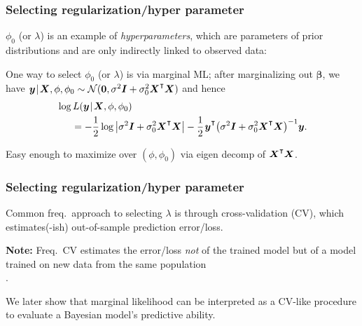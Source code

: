 \documentclass[18pt]{beamer}
\newcommand{\defineTightSpacing}{%
	\setlength{\abovedisplayskip}{.25\baselineskip}%
	\setlength{\belowdisplayskip}{.25\baselineskip}%
}
\renewcommand{\textsc}[1]{{\small \MakeUppercase{#1}}}
\newcommand{\given}{\thinnerspace | \thinnerspace}
\newcommand{\transpose}{\text{\raisebox{.5ex}{$\intercal$}}}
\newcommand{\thinnerspace}{\mskip.5\thinmuskip}
\newcommand{\normalDist}{\mathcal{N}}
\newcommand{\likelihood}{L}
\newcommand{\by}{\bm{y}}
\newcommand{\bX}{\bm{X}}
\newcommand{\bbeta}{\bm{\beta}}
\newcommand{\Id}{\bm{I}}
\begin{document}
\begin{frame}
\frametitle{Selecting regularization/hyper parameter}
$\phi_0$ (or $\lambda$) is an example of \textit{hyperparameters}, which are parameters of prior distributions and are only indirectly linked to observed data:%
\vspace*{-.3\baselineskip}
\begin{figure} 
\end{figure}
\vspace*{-.7\baselineskip}

One way to select $\phi_0$ (or $\lambda$) is via marginal \textsc{ML};
after marginalizing out $\bbeta$, we have $\thinnerspace \by \given \bX, \phi, \phi_0 \sim \normalDist(\bm{0}, \sigma^2 \Id + \sigma_0^2 \bX^\transpose \bX)$ and hence
\begin{equation*} \defineTightSpacing%
\begin{aligned}
&\log \likelihood(\by \given \bX, \phi, \phi_0)\\
&\hspace*{1.5em}= - \frac12 \log \left| \sigma^2 \Id + \sigma_0^2 \bX^\transpose \bX \right|
	- \frac12 \thinnerspace \by^\transpose \! \left( \sigma^2 \Id + \sigma_0^2 \bX^\transpose \bX \right)^{-1}\! \by.
\end{aligned}
\end{equation*}

Easy enough to maximize over $(\phi, \phi_0)$ via eigen decomp of $\bX^\transpose \bX$.
\end{frame}


\begin{frame}
\frametitle{Selecting regularization/hyper parameter}
Common freq.\ approach to selecting $\lambda$ is through cross-validation (\textsc{CV}), which estimates(-ish) out-of-sample prediction error/loss.

\smallskip
\textbf{Note:} Freq.\ \textsc{CV} estimates the error/loss \textit{not} of the trained model but of a model trained on new data from the same population\\
\hfill \citep{hastie2009esl, bates2023cross_validation}.

\smallskip
We later show that marginal likelihood can be interpreted as a \textsc{CV}-like procedure to evaluate a Bayesian model's predictive ability.
\end{frame}
\end{document}
